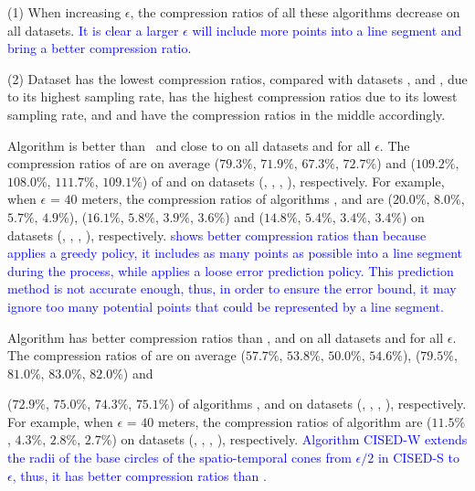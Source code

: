 {\ni (1) When increasing $\epsilon$, the compression ratios of all these algorithms decrease on all datasets.
\textcolor{blue}{It is clear a larger $\epsilon$ will include more points into a line segment and bring a better compression ratio.}

\ni (2) Dataset \pricar has the lowest compression ratios, compared with datasets \mopsi, \sercar and \geolife, due to its highest sampling rate,
\sercar has the highest compression ratios due to its lowest sampling rate, and \geolife and \mopsi have the compression ratios in the middle accordingly.

 Algorithm \cist is better than \squishe ~{and close to} \dps on all datasets and for all $\epsilon$.
%
The compression ratios of \cist are on average {($79.3\%$, $71.9\%$, $67.3\%$, $72.7\%$) and ($109.2\%$, $108.0\%$, $111.7\%$, $109.1\%$)} of \squishe and
\dps on {datasets (\sercar, \geolife, \mopsi, \pricar)}, respectively.
For example, when $\epsilon$ = $40$ meters, the compression ratios of algorithms
\squishe, \cist and \dps are
{($20.0\%$, $8.0\%$, $5.7\%$, $4.9\%$), ($16.1\%$, $5.8\%$, $3.9\%$, $3.6\%$) and ($14.8\%$, $5.4\%$, $3.4\%$, $3.4\%$)} on  {datasets (\sercar, \geolife, \mopsi, \pricar)}, respectively.
\textcolor{blue}{\cist shows better compression ratios than \squishe because \cist applies a greedy policy, \ie it includes as many points as possible into a line segment during the process, while \squishe applies a loose error prediction policy. This prediction method is not accurate enough, thus, in order to ensure the error bound, it may ignore too many potential points that could be represented by a line segment.}


 Algorithm \cista has better compression ratios than \dps, \squishe and \cist on all datasets and for all $\epsilon$.
The compression ratios of \cista are on average ($57.7\%$, $53.8\%$, $50.0\%$, $54.6\%$), ($79.5\%$, $81.0\%$, $83.0\%$, $82.0\%$) and {($72.9\%$, $75.0\%$, $74.3\%$, $75.1\%$) of algorithms
\squishe, \dps and \cist on {datasets (\sercar, \geolife, \mopsi, \pricar)}, respectively.
For example, when $\epsilon$ = $40$ meters, the compression ratios of algorithm
\cista are ($11.5\%$, $4.3\%$, $2.8\%$, $2.7\%$) on datasets (\sercar, \geolife, \mopsi, \pricar), respectively.
%
\textcolor{blue}{Algorithm CISED-W extends the radii of the base circles of the spatio-temporal cones from $\epsilon/2$ in CISED-S to $\epsilon$, thus, it has better compression ratios than \cist.}

}}
